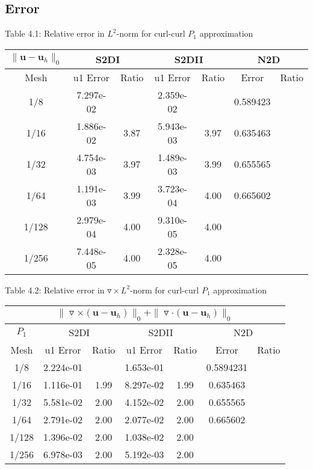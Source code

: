 \documentclass[a4paper,11pt]{article}
\begin{document}
\subsection{Error}
\begin{center}
Table 4.1: {Relative error in $L^2$-norm for curl-curl $P_1$ approximation}
\begin{tabular}{|c|c|c|c|c|c|c|}
  \hline
  \multicolumn{1}{|c}{$\|\mathbf{u} - \mathbf{u}_{h}\|_{0}$} & \multicolumn{2}{|c}{S2DI} & \multicolumn{2}{|c}{S2DII}& \multicolumn{2}{|c|}{N2D} \\
  \hline
    Mesh  & u1 Error & Ratio & u1 Error & Ratio & Error & Ratio  \\
  \hline
    1/8    &  7.297e-02  &        &  2.359e-02  &	    & 0.589423  &       \\
    1/16   &  1.886e-02  &  3.87  &  5.943e-03  & 3.97  & 0.635463  &       \\
    1/32   &  4.754e-03  &  3.97  &  1.489e-03  & 3.99  & 0.655565  &       \\
    1/64   &  1.191e-03  &  3.99  &  3.723e-04  & 4.00  & 0.665602  &       \\
    1/128  &  2.979e-04  &  4.00  &  9.310e-05  & 4.00  &           &       \\
    1/256  &  7.448e-05  &  4.00  &  2.328e-05  & 4.00  &           &       \\
  \hline
\end{tabular}
\end{center}
\begin{center}
Table 4.2: {Relative error in $\triangledown\times L^2$-norm for curl-curl $P_1$ approximation}
\begin{tabular}{|c|c|c|c|c|c|c|}
  \hline
  \multicolumn{7}{|c|}{ $\|\triangledown\times(\mathbf{u} - \mathbf{u}_h)\|_0 + \|\triangledown\cdot(\mathbf{u} - \mathbf{u}_h)\|_0$}  \\
  \hline
  \multicolumn{1}{|c}{$P_1$} & \multicolumn{2}{|c}{S2DI} & \multicolumn{2}{|c}{S2DII}& \multicolumn{2}{|c|}{N2D}   \\
  \hline
    Mesh  & u1 Error & Ratio & u1 Error & Ratio & Error & Ratio  \\
  \hline
    1/8   &  2.224e-01  &      & 1.653e-01  &	   & 0.5894231  &       \\
    1/16  &  1.116e-01  & 1.99 & 8.297e-02  & 1.99 & 0.635463   &       \\
    1/32  &  5.581e-02  & 2.00 & 4.152e-02  & 2.00 & 0.655565   &       \\
    1/64  &  2.791e-02  & 2.00 & 2.077e-02  & 2.00 & 0.665602   &       \\
    1/128 &  1.396e-02  & 2.00 & 1.038e-02  & 2.00 &            &       \\
    1/256 &  6.978e-03  & 2.00 & 5.192e-03  & 2.00 &            &       \\
  \hline
\end{tabular}
\end{center}
\end{document}
